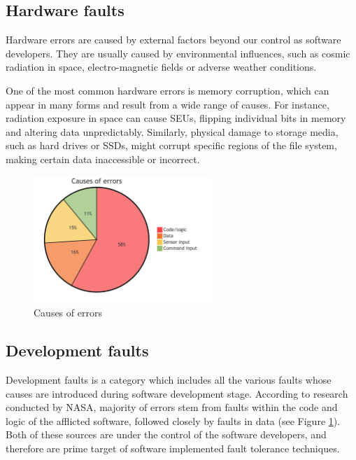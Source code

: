 \subsection{Hardware faults}

Hardware errors are caused by external factors beyond our control as software developers. They are usually caused by environmental influences, such as cosmic radiation in space, electro-magnetic fields or adverse weather conditions.

One of the most common hardware errors is memory corruption, which can appear in many forms and result from a wide range of causes. For instance, radiation exposure in space can cause SEUs, flipping individual bits in memory and altering data unpredictably. Similarly, physical damage to storage media, such as hard drives or SSDs, might corrupt specific regions of the file system, making certain data inaccessible or incorrect.


\begin{figure}[!hbt]
    \centering
    \includegraphics[width=0.6\textwidth]{diagrams/stats/piechart.png}
    \caption{Causes of errors \cite{nasa:stats}}
    \label{fig:nasa_stats}
\end{figure}

\subsection{Development faults}

Development faults is a category which includes all the various faults whose causes are introduced during software development stage. According to research conducted by NASA, majority of errors stem from faults within the code and logic of the afflicted software, followed closely by faults in data \cite{nasa:stats} (see Figure \ref{fig:nasa_stats}). Both of these sources are under the control of the software developers, and therefore are prime target of software implemented fault tolerance techniques.

